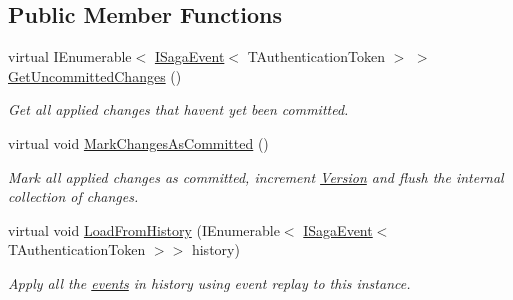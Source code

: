 \subsection*{Public Member Functions}
\begin{DoxyCompactItemize}
\item 
virtual I\+Enumerable$<$ \hyperlink{interfaceCqrs_1_1Events_1_1ISagaEvent}{I\+Saga\+Event}$<$ T\+Authentication\+Token $>$ $>$ \hyperlink{classCqrs_1_1Akka_1_1Domain_1_1AkkaSagaProxy_a8cad3415bc5474a01bfdb2db3a852ea5_a8cad3415bc5474a01bfdb2db3a852ea5}{Get\+Uncommitted\+Changes} ()
\begin{DoxyCompactList}\small\item\em Get all applied changes that haven\textquotesingle{}t yet been committed. \end{DoxyCompactList}\item 
virtual void \hyperlink{classCqrs_1_1Akka_1_1Domain_1_1AkkaSagaProxy_a5a5c012bc0f7f957b8bd2298956ca9ae_a5a5c012bc0f7f957b8bd2298956ca9ae}{Mark\+Changes\+As\+Committed} ()
\begin{DoxyCompactList}\small\item\em Mark all applied changes as committed, increment \hyperlink{classCqrs_1_1Akka_1_1Domain_1_1AkkaSagaProxy_ab6272400fe5c6227a11cf5c93f752d4d_ab6272400fe5c6227a11cf5c93f752d4d}{Version} and flush the internal collection of changes. \end{DoxyCompactList}\item 
virtual void \hyperlink{classCqrs_1_1Akka_1_1Domain_1_1AkkaSagaProxy_a21b69799b046c1fcdf5b2443699dee0c_a21b69799b046c1fcdf5b2443699dee0c}{Load\+From\+History} (I\+Enumerable$<$ \hyperlink{interfaceCqrs_1_1Events_1_1ISagaEvent}{I\+Saga\+Event}$<$ T\+Authentication\+Token $>$$>$ history)
\begin{DoxyCompactList}\small\item\em Apply all the \hyperlink{}{events} in {\itshape history}  using event replay to this instance. \end{DoxyCompactList}\end{DoxyCompactItemize}
